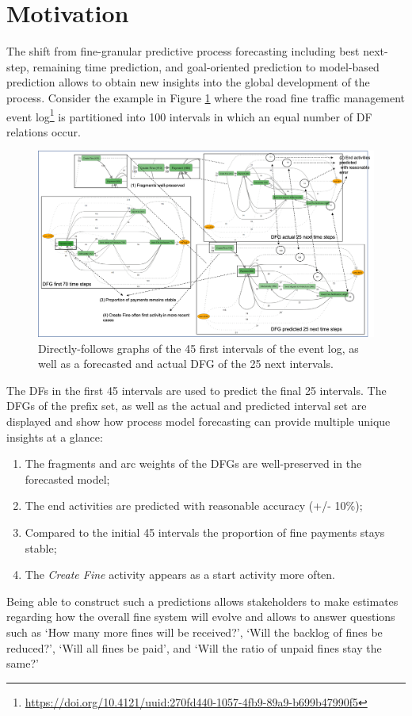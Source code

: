 \section{Motivation}\label{sec:2:motivation}

The shift from fine-granular predictive process forecasting including best next-step, remaining time prediction, and goal-oriented prediction to model-based prediction allows to obtain new insights into the global development of the process.
Consider the example in Figure \ref{fig:dfg_example_intro} where the road fine traffic management event log\footnote{\url{https://doi.org/10.4121/uuid:270fd440-1057-4fb9-89a9-b699b47990f5}} is partitioned into 100 intervals in which an equal number of DF relations occur.
\begin{figure}
    \centering
    \includegraphics[width=\textwidth]{img/MotExample.png}
    \caption{Directly-follows graphs of the 45 first intervals of the event log, as well as a forecasted and actual DFG of the 25 next intervals.}
    \label{fig:dfg_example_intro}
\end{figure}
The DFs in the first 45 intervals are used to predict the final 25 intervals.
The DFGs of the prefix set, as well as the actual and predicted interval set are displayed and show how process model forecasting can provide multiple unique insights at a glance:
\begin{enumerate}
    \item The fragments and arc weights of the DFGs are well-preserved in the forecasted model;
    \item The end activities are predicted with reasonable accuracy (+/- 10\%);
    \item Compared to the initial 45 intervals the proportion of fine payments stays stable;
    \item The \emph{Create Fine} activity appears as a start activity more often.
\end{enumerate}
Being able to construct such a predictions allows stakeholders to make estimates regarding how the overall fine system will evolve and allows to answer questions such as `How many more fines will be received?', `Will the backlog of fines be reduced?', `Will all fines be paid', and `Will the ratio of unpaid fines stay the same?'

